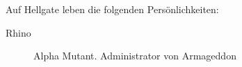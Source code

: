 
Auf Hellgate leben die folgenden Persönlichkeiten: 

\begin{description}    
    \item[Rhino] Alpha Mutant. Administrator von Armageddon
\end{description}